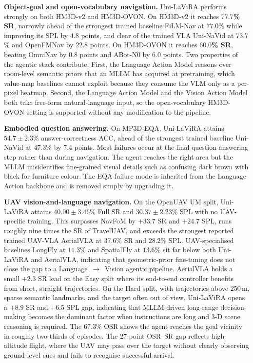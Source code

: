 \documentclass[conference]{IEEEtran}
\newcommand{\ourmethod}{Uni-LaViRA\xspace}
\begin{document}
\textbf{Object-goal and open-vocabulary navigation.} \ourmethod performs
strongly on both HM3D-v2 and HM3D-OVON. On HM3D-v2 it reaches \textbf{$77.7$\%
SR}, narrowly ahead of the strongest trained baseline FiLM-Nav
at $77.0$\% while improving its SPL by $4.8$ points, and clear of the trained
VLA Uni-NaVid at $73.7$\% and OpenFMNav by $22.8$
points. On
HM3D-OVON it reaches \textbf{$60.0$\% SR}, beating OmniNav by
$0.8$ points and ABot-N0 by $6.0$ points. Two properties of the agentic stack
contribute. First, the Language Action Model reasons over room-level semantic
priors that an MLLM has acquired at pretraining, which value-map baselines
cannot exploit because they consume the VLM only as a per-pixel heatmap.
Second, the Language Action Model and the Vision Action Model both take
free-form natural-language input, so the open-vocabulary HM3D-OVON setting is
supported without any modification to the pipeline.

\textbf{Embodied question answering.}
On MP3D-EQA, \ourmethod attains $54.7\pm 2.3$\% answer-correctness
ACC, ahead of the strongest trained baseline Uni-NaVid at
$47.3$\% by $7.4$ points.  Most
failures occur at the final question-answering step rather than
during navigation.  The agent reaches the right area but the
MLLM misidentifies fine-grained visual details such as
confusing dark brown with black for furniture colour.
The EQA failure mode is inherited
from the Language Action backbone and is removed simply by
upgrading it.

\textbf{UAV vision-and-language navigation.} On the OpenUAV UM split,
\ourmethod attains $40.00\pm 3.46$\% Full SR and $30.37\pm 2.23$\% SPL with no
UAV-specific training. This surpasses NavFoM by $+33.7$ SR and $+24.7$ SPL,
runs roughly nine times the SR of TravelUAV, and exceeds the strongest
reported trained UAV-VLA AerialVLA at $37.6$\% SR and $28.2$\% SPL.
UAV-specialised baselines LongFly at $11.3$\% and SpatialFly at $13.6$\% sit
far below both \ourmethod and AerialVLA, indicating that geometric-prior
fine-tuning does not close the gap to a Language~$\to$~Vision agentic
pipeline. AerialVLA holds a small $+2.3$ SR lead on the Easy split where its
end-to-end controller benefits from short, straight trajectories. On the Hard
split, with trajectories above $250$\,m, sparse semantic landmarks, and the
target often out of view, \ourmethod opens a $+8.9$ SR and $+6.5$ SPL gap,
indicating that MLLM-driven long-range decision-making becomes the dominant
factor when instructions are long and 3-D scene reasoning is required. The
$67.3$\% OSR shows the agent reaches the goal vicinity in roughly two-thirds
of episodes. The $27$-point OSR--SR gap reflects high-altitude flight, where
the UAV may pass over the target without clearly observing ground-level cues
and fails to recognise successful arrival.
\end{document}

